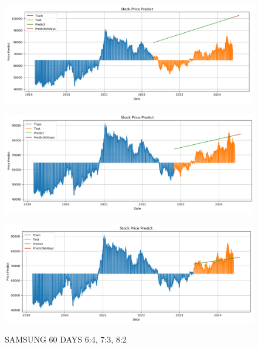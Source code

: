 \documentclass{article}
\begin{document}
\begin{multicols}{2}
\begin{figure}[H]
    \centering
    \begin{minipage}{0.15\textwidth}
    \centering
    \includegraphics[width=1\textwidth]{Image/Linear/Linear_SAMSUNG_6_4_60DAYS.png}
   
    \label{fig:1}
    \end{minipage}%
    \begin{minipage}{0.15\textwidth}
    \centering
    \includegraphics[width=1\textwidth]{Image/Linear/Linear_SAMSUNG_7_3_60DAYS.png}
  
    \label{fig:2}
    \end{minipage}%
    \begin{minipage}{0.15\textwidth}
    \centering
    \includegraphics[width=1\textwidth]{Image/Linear/Linear_SAMSUNG_8_2_60DAYS.png}

    \label{fig:3}
    \end{minipage}
    \caption{SAMSUNG 60 DAYS  6:4, 7:3, 8:2 }
\end{figure}


\end{multicols}
\end{document}
